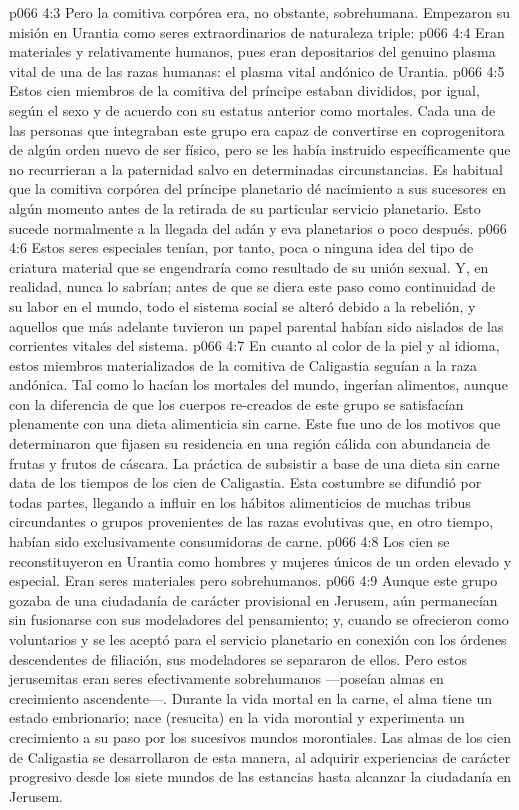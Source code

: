 \vs p066 4:3 Pero la comitiva corpórea era, no obstante, sobrehumana. Empezaron su misión en Urantia como seres extraordinarios de naturaleza triple:
\vs p066 4:4 Eran materiales y relativamente humanos, pues eran depositarios del genuino plasma vital de una de las razas humanas: el plasma vital andónico de Urantia.
\vs p066 4:5 Estos cien miembros de la comitiva del príncipe estaban divididos, por igual, según el sexo y de acuerdo con su estatus anterior como mortales. Cada una de las personas que integraban este grupo era capaz de convertirse en coprogenitora de algún orden nuevo de ser físico, pero se les había instruido específicamente que no recurrieran a la paternidad salvo en determinadas circunstancias. Es habitual que la comitiva corpórea del príncipe planetario dé nacimiento a sus sucesores en algún momento antes de la retirada de su particular servicio planetario. Esto sucede normalmente a la llegada del adán y eva planetarios o poco después.
\vs p066 4:6 Estos seres especiales tenían, por tanto, poca o ninguna idea del tipo de criatura material que se engendraría como resultado de su unión sexual. Y, en realidad, nunca lo sabrían; antes de que se diera este paso como continuidad de su labor en el mundo, todo el sistema social se alteró debido a la rebelión, y aquellos que más adelante tuvieron un papel parental habían sido aislados de las corrientes vitales del sistema.
\vs p066 4:7 En cuanto al color de la piel y al idioma, estos miembros materializados de la comitiva de Caligastia seguían a la raza andónica. Tal como lo hacían los mortales del mundo, ingerían alimentos, aunque con la diferencia de que los cuerpos re\hyp{}creados de este grupo se satisfacían plenamente con una dieta alimenticia sin carne. Este fue uno de los motivos que determinaron que fijasen su residencia en una región cálida con abundancia de frutas y frutos de cáscara. La práctica de subsistir a base de una dieta sin carne data de los tiempos de los cien de Caligastia. Esta costumbre se difundió por todas partes, llegando a influir en los hábitos alimenticios de muchas tribus circundantes o grupos provenientes de las razas evolutivas que, en otro tiempo, habían sido exclusivamente consumidoras de carne.
\vs p066 4:8 Los cien se reconstituyeron en Urantia como hombres y mujeres únicos de un orden elevado y especial. Eran seres materiales pero sobrehumanos.
\vs p066 4:9 Aunque este grupo gozaba de una ciudadanía de carácter provisional en Jerusem, aún permanecían sin fusionarse con sus modeladores del pensamiento; y, cuando se ofrecieron como voluntarios y se les aceptó para el servicio planetario en conexión con los órdenes descendentes de filiación, sus modeladores se separaron de ellos. Pero estos jerusemitas eran seres efectivamente sobrehumanos ---poseían almas en crecimiento ascendente---. Durante la vida mortal en la carne, el alma tiene un estado embrionario; nace (resucita) en la vida morontial y experimenta un crecimiento a su paso por los sucesivos mundos morontiales. Las almas de los cien de Caligastia se desarrollaron de esta manera, al adquirir experiencias de carácter progresivo desde los siete mundos de las estancias hasta alcanzar la ciudadanía en Jerusem.
